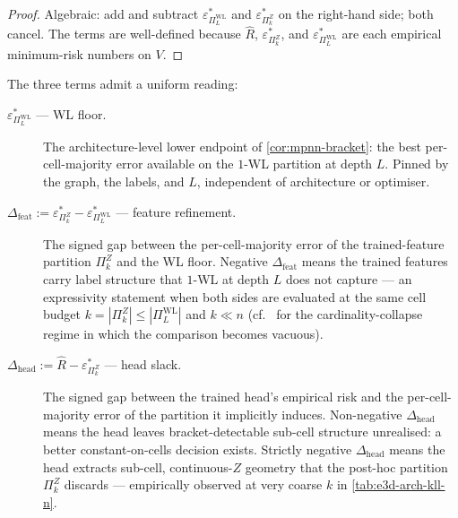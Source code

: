 \documentclass[10pt]{article}
\theoremstyle{definition}
\theoremstyle{remark}
\newcommand{\eps}{\varepsilon}
\begin{document}
\begin{proof}
Algebraic: add and subtract $\eps^{*}_{\Pi^{\mathrm{WL}}_{L}}$
and $\eps^{*}_{\Pi^{Z}_{k}}$ on the right-hand side; both
cancel. The terms are well-defined because $\hat R$,
$\eps^{*}_{\Pi^{Z}_{k}}$, and $\eps^{*}_{\Pi^{\mathrm{WL}}_{L}}$
are each empirical minimum-risk numbers on $V$.
\end{proof}

The three terms admit a uniform reading:
\begin{description}
  \item[$\eps^{*}_{\Pi^{\mathrm{WL}}_{L}}$ --- WL floor.]
    The architecture-level lower endpoint of
    \cref{cor:mpnn-bracket}: the best per-cell-majority error
    available on the $1$-WL partition at depth $L$. Pinned
    by the graph, the labels, and $L$, independent of
    architecture or optimiser.
  \item[$\Delta_{\mathrm{feat}} := \eps^{*}_{\Pi^{Z}_{k}} -
    \eps^{*}_{\Pi^{\mathrm{WL}}_{L}}$ --- feature refinement.]
    The signed gap between the per-cell-majority error of the
    trained-feature partition $\Pi^{Z}_{k}$ and the WL floor.
    Negative $\Delta_{\mathrm{feat}}$ means the trained features
    carry label structure that $1$-WL at depth $L$ does not
    capture --- an expressivity statement when both sides are
    evaluated at the same cell budget $k = |\Pi^{Z}_{k}| \le
    |\Pi^{\mathrm{WL}}_{L}|$ and $k \ll n$ (cf.\
     for the cardinality-collapse
    regime in which the comparison becomes vacuous).
  \item[$\Delta_{\mathrm{head}} := \hat R -
    \eps^{*}_{\Pi^{Z}_{k}}$ --- head slack.]
    The signed gap between the trained head's empirical risk and
    the per-cell-majority error of the partition it implicitly
    induces. Non-negative $\Delta_{\mathrm{head}}$ means the head
    leaves bracket-detectable sub-cell structure unrealised:
    a better constant-on-cells decision exists. Strictly
    negative $\Delta_{\mathrm{head}}$ means the head extracts
    sub-cell, continuous-$Z$ geometry that the post-hoc
    partition $\Pi^{Z}_{k}$ discards --- empirically observed at
    very coarse $k$ in \cref{tab:e3d-arch-kll-n}.
\end{description}
\end{document}

